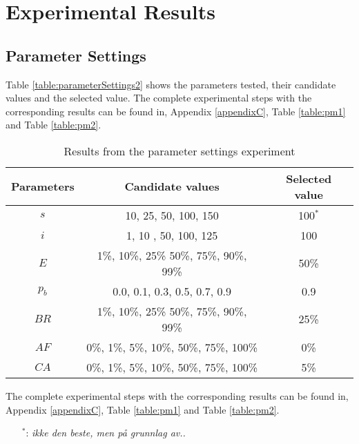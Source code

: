 \section{Experimental Results}


\subsection{Parameter Settings}
\label{subsec:parameterSettings_results}

Table \vref{table:parameterSettings2} shows the parameters tested, their candidate values and the selected value. The complete experimental steps with the corresponding results can be found in, Appendix \ref{appendixC}, Table \vref{table:pm1} and Table \vref{table:pm2}. 
    \begin{table}[H]
    \centering
    \begin{tabular}{|c|c||c|}
    \hline
    Parameters & Candidate values & Selected value\\
    \hline
    $s$ & 10, 25, 50, 100, 150 & 100$^*$ \\
    $i$ & 1, 10 , 50, 100, 125 & 100 \\
    $E$ & 1\%, 10\%, 25\% 50\%, 75\%, 90\%, 99\% & 50\% \\
    $p_{b}$ & 0.0, 0.1, 0.3, 0.5, 0.7, 0.9 & 0.9 \\
    $BR$ & 1\%, 10\%, 25\% 50\%, 75\%, 90\%, 99\% & 25\% \\
    $AF$ & 0\%, 1\%, 5\%, 10\%, 50\%, 75\%, 100\% & 0\% \\
    $CA$ & 0\%, 1\%, 5\%, 10\%, 50\%, 75\%, 100\% & 5\% \\
    \hline
    \end{tabular}
    \caption {Results from the parameter settings experiment}
    The complete experimental steps with the corresponding results can be found in, Appendix \ref{appendixC}, Table \vref{table:pm1} and Table \vref{table:pm2}.
    \begin{itemize}[noitemsep]
    \item[$^*$:] \emph{\color{red} ikke den beste, men på grunnlag av..}
    \end{itemize}
    \label{table:parameterSettings2}
    \end{table}


